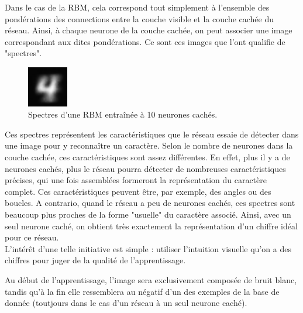 \documentclass[a4paper,twoside]{report}
\begin{document}
                Dans le cas de la RBM, cela correspond tout simplement à l'ensemble des pondérations des connections entre la couche visible et la couche cachée du réseau. Ainsi, à chaque neurone de la couche cachée, on peut associer une image correspondant aux dites pondérations. Ce sont ces images que l'ont qualifie de "spectres".

                \begin{figure}
                    \begin{center}
                        \includegraphics[width=50pt]{Images/spectres-01.png}
                    \end{center}
                    \caption{Spectres d'une RBM entraînée à 10 neurones cachés.}
                \end{figure}

                Ces spectres représentent les caractéristiques que le réseau essaie de détecter dans une image pour y reconnaître un caractère. Selon le nombre de neurones dans la couche cachée, ces caractéristiques sont assez différentes. En effet, plus il y a de neurones cachés, plus le réseau pourra détecter de nombreuses caractéristiques précises, qui une fois assemblées formeront la représentation du caractère complet. Ces caractéristiques peuvent être, par exemple, des angles ou des boucles. A contrario, quand le réseau a peu de neurones cachés, ces spectres sont beaucoup plus proches de la forme "usuelle" du caractère associé. Ainsi, avec un seul neurone caché, on obtient très exactement la représentation d'un chiffre idéal pour ce réseau.\\

                L'intérêt d'une telle initiative est simple : utiliser l'intuition visuelle qu'on a des chiffres pour juger de la qualité de l'apprentissage.

                Au début de l'apprentissage, l'image sera exclusivement composée de bruit blanc, tandis qu'à la fin elle ressemblera au négatif d'un des exemples de la base de donnée (toutjours dans le cas d'un réseau à un seul neurone caché).
\end{document}
